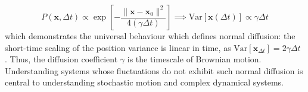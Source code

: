 \begin{equation}\label{eq:normal_diffusion}
    P(\textbf{x}, \Delta t) \propto \exp \left[ -\frac{\|\textbf{x} - \textbf{x}_0 \|^2}{4 (\gamma \Delta t)}\right] \implies \text{Var}[\textbf{x}(\Delta t)] \propto \gamma \Delta t
\end{equation}
which demonstrates the universal behaviour which defines normal diffusion: the short-time scaling of the position variance is linear in time, as $\text{Var}[\textbf{x}_{\Delta t}] = 2 \gamma \Delta t$ \cite{klafter_anomalous_2005, vilk_strong_2025, sposini_towards_2022, oliveira_anomalous_2019}. Thus, the diffusion coefficient $\gamma$ is the timescale of Brownian motion. Understanding systems whose fluctuations do not exhibit such normal diffusion is central to understanding stochastic motion and complex dynamical systems.


